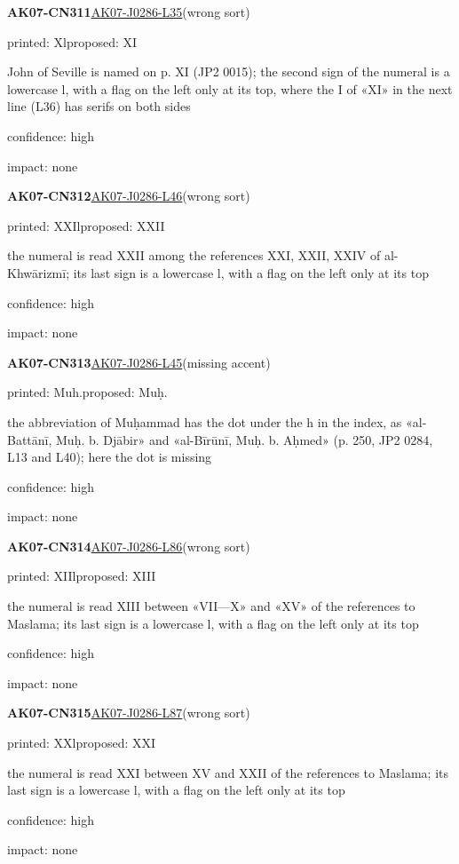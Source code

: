 \documentclass[11pt]{article}
\begin{document}
\noindent\textbf{AK07-CN311}\enspace\hyperlink{AK07-J0286-L35}{AK07-J0286-L35}\enspace(wrong sort)\par\noindent printed: Xl\enspace proposed: XI\par\noindent John of Seville is named on p. XI (JP2 0015); the second sign of the numeral is a lowercase l, with a flag on the left only at its top, where the I of «XI» in the next line (L36) has serifs on both sides\par\noindent confidence: high\par\noindent impact: none\par\medskip
\noindent\textbf{AK07-CN312}\enspace\hyperlink{AK07-J0286-L46}{AK07-J0286-L46}\enspace(wrong sort)\par\noindent printed: XXIl\enspace proposed: XXII\par\noindent the numeral is read XXII among the references XXI, XXII, XXIV of al-Khwārizmī; its last sign is a lowercase l, with a flag on the left only at its top\par\noindent confidence: high\par\noindent impact: none\par\medskip
\noindent\textbf{AK07-CN313}\enspace\hyperlink{AK07-J0286-L45}{AK07-J0286-L45}\enspace(missing accent)\par\noindent printed: Muh.\enspace proposed: Muḥ.\par\noindent the abbreviation of Muḥammad has the dot under the h in the index, as «al-Battānī, Muḥ. b. Djābir» and «al-Bīrūnī, Muḥ. b. Aḥmed» (p. 250, JP2 0284, L13 and L40); here the dot is missing\par\noindent confidence: high\par\noindent impact: none\par\medskip
\noindent\textbf{AK07-CN314}\enspace\hyperlink{AK07-J0286-L86}{AK07-J0286-L86}\enspace(wrong sort)\par\noindent printed: XIIl\enspace proposed: XIII\par\noindent the numeral is read XIII between «VII—X» and «XV» of the references to Maslama; its last sign is a lowercase l, with a flag on the left only at its top\par\noindent confidence: high\par\noindent impact: none\par\medskip
\noindent\textbf{AK07-CN315}\enspace\hyperlink{AK07-J0286-L87}{AK07-J0286-L87}\enspace(wrong sort)\par\noindent printed: XXl\enspace proposed: XXI\par\noindent the numeral is read XXI between XV and XXII of the references to Maslama; its last sign is a lowercase l, with a flag on the left only at its top\par\noindent confidence: high\par\noindent impact: none\par\medskip
\end{document}
